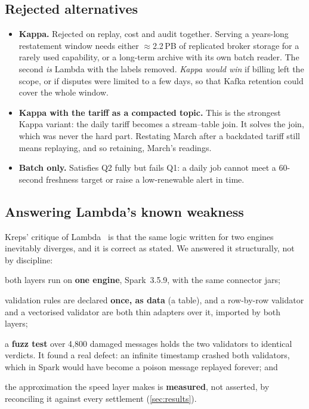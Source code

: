 \documentclass[11pt,a4paper]{article}
\newcommand{\code}[1]{\texttt{\detokenize{#1}}}
\newcommand{\sq}{Q}
\begin{document}
\subsection{Rejected alternatives}
\begin{itemize}
  \item \textbf{Kappa.} Rejected on replay, cost and audit together. Serving a
  years-long restatement window needs either $\approx$2.2\,PB of replicated broker
  storage for a rarely used capability, or a long-term archive with its own batch
  reader. The second \emph{is} Lambda with the labels removed. \emph{Kappa would win}
  if billing left the scope, or if disputes were limited to a few days, so that Kafka
  retention could cover the whole window.
  \item \textbf{Kappa with the tariff as a compacted topic.} This is the strongest
  Kappa variant: the daily tariff becomes a stream--table join. It solves the join,
  which was never the hard part. Restating March after a backdated tariff still
  means replaying, and so retaining, March's readings.
  \item \textbf{Batch only.} Satisfies \sq2 fully but fails \sq1: a daily job cannot
  meet a 60-second freshness target or raise a low-renewable alert in time.
\end{itemize}

\subsection{Answering Lambda's known weakness}
Kreps' critique of Lambda~\cite{kreps2014} is that the same logic written for two
engines inevitably diverges, and it is correct as stated. We answered it
structurally, not by discipline:
\begin{enumerate*}[label=(\roman*)]
  \item both layers run on \textbf{one engine}, Spark~3.5.9, with the same connector jars;
  \item validation rules are declared \textbf{once, as data} (a \code{FieldSpec} table), and
  a row-by-row validator and a vectorised validator are both thin adapters over it,
  imported by both layers;
  \item a \textbf{fuzz test} over 4{,}800 damaged messages holds the two validators to identical
  verdicts. It found a real defect: an infinite timestamp crashed both validators,
  which in Spark would have become a poison message replayed forever; and
  \item the approximation the speed layer makes is \textbf{measured}, not asserted, by
  reconciling it against every settlement (\cref{sec:results}).
\end{enumerate*}
\end{document}
